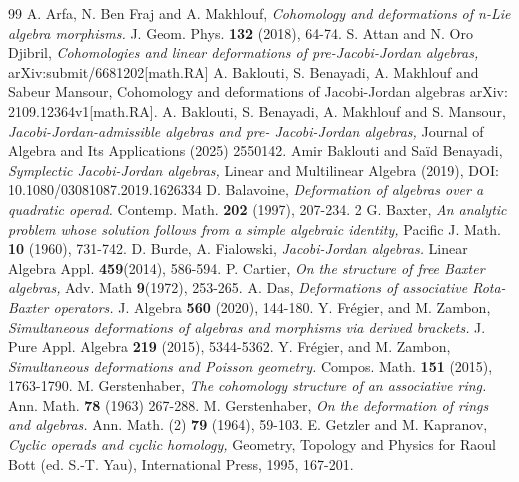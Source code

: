 \documentclass[12pt]{amsart}
\begin{document}
\begin{thebibliography}{99}	
	 A. Arfa, N. Ben Fraj and A. Makhlouf, {\it Cohomology and deformations of n-Lie algebra morphisms.} J. Geom.
	Phys. {\bf 132} (2018), 64-74.
	 S. Attan and N. Oro Djibril, {\it Cohomologies and linear deformations
		of pre-Jacobi-Jordan algebras,} arXiv:submit/6681202[math.RA]
		 A. Baklouti, S. Benayadi, A. Makhlouf and Sabeur Mansour, Cohomology and deformations of Jacobi-Jordan
		algebras arXiv: 2109.12364v1[math.RA].
		 A. Baklouti, S. Benayadi, A. Makhlouf and S. Mansour, {\it Jacobi-Jordan-admissible algebras and pre-
		Jacobi-Jordan algebras,} Journal of Algebra and Its Applications (2025) 2550142.
		 Amir Baklouti and Saïd Benayadi, {\it Symplectic Jacobi-Jordan algebras,} Linear and Multilinear Algebra (2019),  DOI: 10.1080/03081087.2019.1626334
		 D. Balavoine, {\it Deformation of algebras over a quadratic operad.} Contemp. Math. {\bf 202} (1997), 207-234. 2
		 G. Baxter, {\it An analytic problem whose solution follows from a simple algebraic identity,} Pacific J. Math. {\bf 10} (1960), 731-742.
		 D. Burde, A. Fialowski, {\it Jacobi-Jordan algebras.} Linear Algebra Appl. {\bf 459}(2014), 586-594.
		 P. Cartier, {\it On the structure of free Baxter algebras,}  Adv. Math {\bf 9}(1972), 253-265.
		 A. Das, {\it Deformations of associative Rota-Baxter operators.} J. Algebra {\bf 560} (2020), 144-180. 
		 Y. Fr\'egier, and M. Zambon, {\it Simultaneous deformations of algebras and morphisms via derived brackets.} J.
		Pure Appl. Algebra {\bf 219} (2015), 5344-5362.
	 Y. Fr\'egier, and M. Zambon, {\it Simultaneous deformations and Poisson geometry.} Compos. Math. {\bf 151} (2015), 1763-1790.
		 M. Gerstenhaber, {\it The cohomology structure of an associative ring.} Ann. Math. {\bf 78} (1963) 267-288.
		 M. Gerstenhaber, {\it On the deformation of rings and algebras.} Ann. Math. (2) {\bf 79} (1964), 59-103.
		 E. Getzler and M. Kapranov, {\it Cyclic operads and cyclic homology,} Geometry, Topology and Physics for Raoul
		Bott (ed. S.-T. Yau), International Press, 1995, 167-201.

\end{thebibliography}
\end{document}
